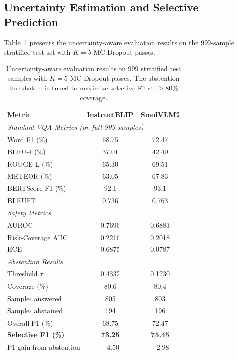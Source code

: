 \documentclass[pdflatex,sn-mathphys-num]{sn-jnl}
\begin{document}
\subsection{Uncertainty Estimation and Selective Prediction}

Table~\ref{tab:uncertainty_results} presents the uncertainty-aware evaluation results on the 999-sample stratified test set with $K = 5$ MC Dropout passes.

\begin{table}[t]
\caption{Uncertainty-aware evaluation results on 999 stratified test samples with $K = 5$ MC Dropout passes. The abstention threshold $\tau$ is tuned to maximize selective F1 at $\geq$80\% coverage.}\label{tab:uncertainty_results}
\begin{tabular*}{\textwidth}{@{\extracolsep\fill}lcc}
\toprule
\textbf{Metric} & \textbf{InstructBLIP} & \textbf{SmolVLM2} \\
\midrule
\multicolumn{3}{l}{\textit{Standard VQA Metrics (on full 999 samples)}} \\
\quad Word F1 (\%) & 68.75 & 72.47 \\
\quad BLEU-4 (\%) & 37.01 & 42.40 \\
\quad ROUGE-L (\%) & 65.30 & 69.51 \\
\quad METEOR (\%) & 63.05 & 67.83 \\
\quad BERTScore F1 (\%) & 92.1 & 93.1 \\
\quad BLEURT & 0.736 & 0.763 \\
\midrule
\multicolumn{3}{l}{\textit{Safety Metrics}} \\
\quad AUROC & 0.7696 & 0.6883 \\
\quad Risk-Coverage AUC & 0.2216 & 0.2018 \\
\quad ECE & 0.6875 & 0.0787 \\
\midrule
\multicolumn{3}{l}{\textit{Abstention Results}} \\
\quad Threshold $\tau$ & 0.4332 & 0.1230 \\
\quad Coverage (\%) & 80.6 & 80.4 \\
\quad Samples answered & 805 & 803 \\
\quad Samples abstained & 194 & 196 \\
\quad Overall F1 (\%) & 68.75 & 72.47 \\
\quad \textbf{Selective F1 (\%)} & \textbf{73.25} & \textbf{75.45} \\
\quad F1 gain from abstention & +4.50 & +2.98 \\
\botrule
\end{tabular*}
\end{table}
\end{document}
